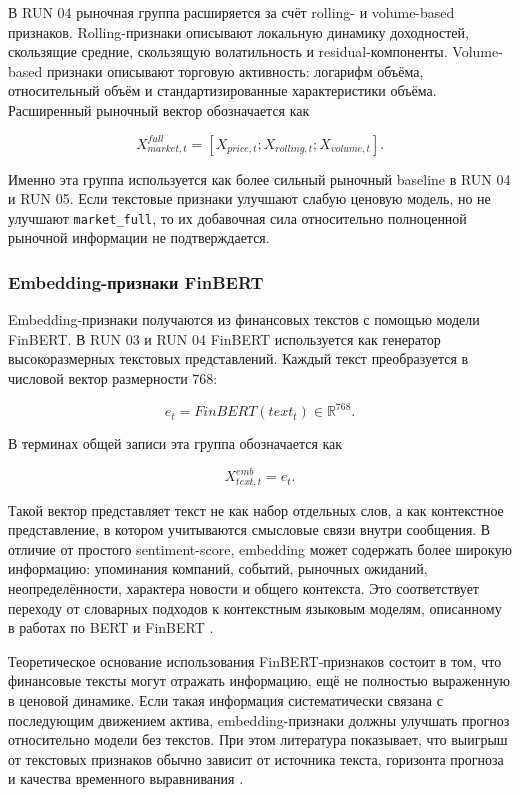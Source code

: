 В RUN 04 рыночная группа расширяется за счёт rolling- и volume-based признаков. Rolling-признаки описывают локальную динамику доходностей, скользящие средние, скользящую волатильность и residual-компоненты. Volume-based признаки описывают торговую активность: логарифм объёма, относительный объём и стандартизированные характеристики объёма. Расширенный рыночный вектор обозначается как

\[
X_{market,t}^{full} = [X_{price,t}; X_{rolling,t}; X_{volume,t}].
\]

Именно эта группа используется как более сильный рыночный baseline в RUN 04 и RUN 05. Если текстовые признаки улучшают слабую ценовую модель, но не улучшают \texttt{market\_full}, то их добавочная сила относительно полноценной рыночной информации не подтверждается.

\subsubsection{Embedding-признаки FinBERT}

Embedding-признаки получаются из финансовых текстов с помощью модели FinBERT. В RUN 03 и RUN 04 FinBERT используется как генератор высокоразмерных текстовых представлений. Каждый текст преобразуется в числовой вектор размерности $768$:

\[
e_t = FinBERT(text_t) \in \mathbb{R}^{768}.
\]

В терминах общей записи эта группа обозначается как

\[
X_{text,t}^{emb} = e_t.
\]

Такой вектор представляет текст не как набор отдельных слов, а как контекстное представление, в котором учитываются смысловые связи внутри сообщения. В отличие от простого sentiment-score, embedding может содержать более широкую информацию: упоминания компаний, событий, рыночных ожиданий, неопределённости, характера новости и общего контекста. Это соответствует переходу от словарных подходов к контекстным языковым моделям, описанному в работах по BERT и FinBERT \cite{devlin2019bert,araci2019finbert,yang2020finbert}.

Теоретическое основание использования FinBERT-признаков состоит в том, что финансовые тексты могут отражать информацию, ещё не полностью выраженную в ценовой динамике. Если такая информация систематически связана с последующим движением актива, embedding-признаки должны улучшать прогноз относительно модели без текстов. При этом литература показывает, что выигрыш от текстовых признаков обычно зависит от источника текста, горизонта прогноза и качества временного выравнивания \cite{tetlock2007media,loughran2011liability,hiew2019bert,zou2022prebit}.

